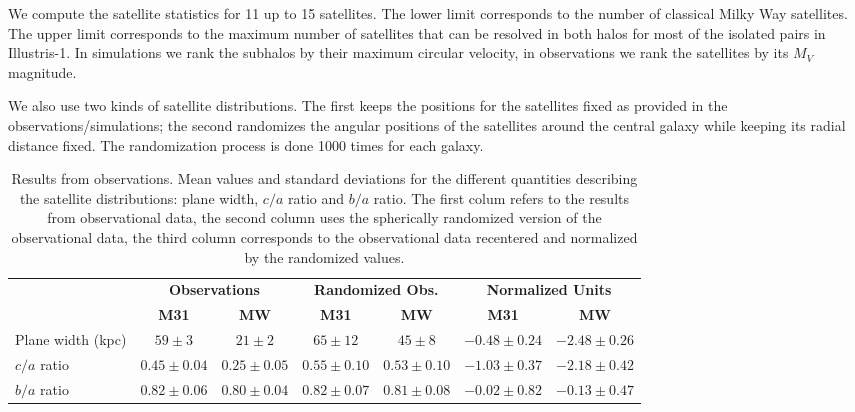 \documentclass[a4paper,fleqn,usenatbib]{mnras}
\begin{document}
We compute the satellite statistics for 11 up to 15 satellites.
The lower limit corresponds to the number of classical Milky Way
satellites.
The upper limit corresponds to the maximum number of satellites that
can be resolved in both halos for most of the isolated pairs in Illustris-1.
In simulations we rank the subhalos by their maximum
circular velocity, in observations we rank the satellites by its $M_V$
magnitude. 

We also use two kinds of satellite distributions. 
The first keeps the positions for the satellites fixed as provided in
the observations/simulations; the second randomizes the angular positions of
the satellites around the central galaxy while keeping its radial
distance fixed. The randomization process is done 1000 times for each
galaxy. 



\begin{table}
  \centering
  \renewcommand{\arraystretch}{1.2}
  \begin{tabular}{|p{2.5cm}|c|c|c|c|c|c|}
    \hline
    \multirow{2}{4.0cm}{} & \multicolumn{2}{c|}{\textbf{Observations}}
    & \multicolumn{2}{c|}{\textbf{Randomized Obs.}} &
    \multicolumn{2}{c|}{\textbf{Normalized Units}}\\
    \cline{2-7}
    & \textbf{M31} & \textbf{MW} & \textbf{M31} & \textbf{MW} & \textbf{M31} & \textbf{MW} \\
    \hline
    Plane width (kpc) & $59\pm 3$  & $21\pm 2$  & $65\pm 12$   &
    $45\pm 8$    & $-0.48\pm 0.24$ & $-2.48\pm 0.26$\\\hline
    $c/a$ ratio & $0.45\pm 0.04$ & $0.25\pm 0.05$ & $0.55\pm0.10$ &
    $0.53\pm 0.10$ & $-1.03\pm 0.37$ & $-2.18\pm 0.42$\\ \hline
    $b/a$ ratio & $0.82\pm 0.06$ & $0.80\pm 0.04$ & $0.82\pm0.07$ &
    $0.81\pm 0.08$ & $-0.02\pm 0.82$ & $-0.13\pm 0.47$\\ \hline
  \end{tabular}
  \caption{Results from observations. Mean values and standard deviations for the different
    quantities describing the satellite distributions: plane width, $c/a$
    ratio and $b/a$ ratio. 
    The first colum refers to the results from
    observational data, the second column uses the spherically
    randomized version of the observational data, the third column
    corresponds to the observational data recentered and normalized
    by the randomized values. \label{table:observations}}
\end{table}
\end{document}
